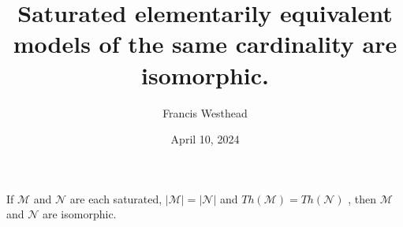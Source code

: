 \documentclass[a4paper]{article}
\title{Saturated elementarily equivalent models of the same cardinality are isomorphic.}
\date{April 10, 2024}
\author{Francis Westhead}
\begin{document}
\maketitle
\par{If \(\mathcal {M}\) and \(\mathcal {N}\) are each saturated, \(| \mathcal {M}|=| \mathcal {N}|\) and \(Th( \mathcal {M})=Th( \mathcal {N})\)
, then \(\mathcal {M}\) and \(\mathcal {N}\) are isomorphic.}
\printbibliography
\end{document}
